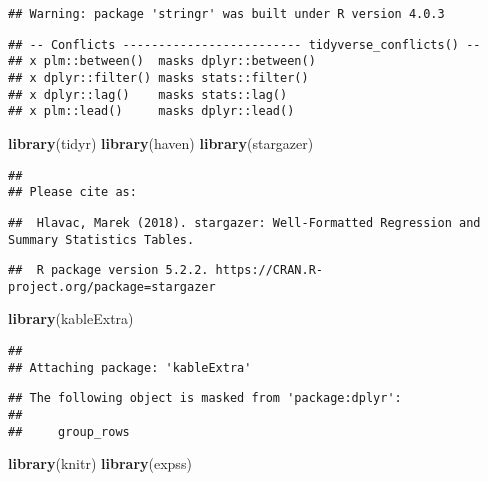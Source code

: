 \documentclass[
]{article}
\newenvironment{Shaded}{\begin{snugshade}}{\end{snugshade}}
\newcommand{\KeywordTok}[1]{\textcolor[rgb]{0.13,0.29,0.53}{\textbf{#1}}}
\newcommand{\NormalTok}[1]{#1}
\begin{document}
\begin{verbatim}
## Warning: package 'stringr' was built under R version 4.0.3
\end{verbatim}

\begin{verbatim}
## -- Conflicts ------------------------- tidyverse_conflicts() --
## x plm::between()  masks dplyr::between()
## x dplyr::filter() masks stats::filter()
## x dplyr::lag()    masks stats::lag()
## x plm::lead()     masks dplyr::lead()
\end{verbatim}

\begin{Shaded}
\begin{Highlighting}[]
\KeywordTok{library}\NormalTok{(tidyr)}
\KeywordTok{library}\NormalTok{(haven)}
\KeywordTok{library}\NormalTok{(stargazer)}
\end{Highlighting}
\end{Shaded}

\begin{verbatim}
## 
## Please cite as:
\end{verbatim}

\begin{verbatim}
##  Hlavac, Marek (2018). stargazer: Well-Formatted Regression and Summary Statistics Tables.
\end{verbatim}

\begin{verbatim}
##  R package version 5.2.2. https://CRAN.R-project.org/package=stargazer
\end{verbatim}

\begin{Shaded}
\begin{Highlighting}[]
\KeywordTok{library}\NormalTok{(kableExtra)}
\end{Highlighting}
\end{Shaded}

\begin{verbatim}
## 
## Attaching package: 'kableExtra'
\end{verbatim}

\begin{verbatim}
## The following object is masked from 'package:dplyr':
## 
##     group_rows
\end{verbatim}

\begin{Shaded}
\begin{Highlighting}[]
\KeywordTok{library}\NormalTok{(knitr)}
\KeywordTok{library}\NormalTok{(expss)}
\end{Highlighting}
\end{Shaded}
\end{document}
